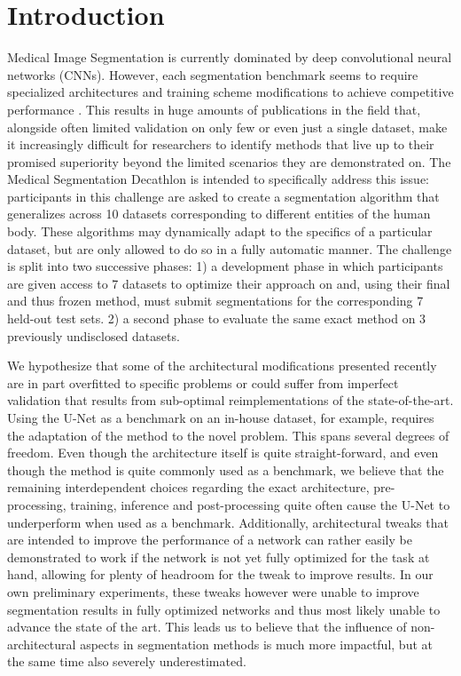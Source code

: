 \documentclass{templates/llncs}
\begin{document}
\section{Introduction}
    Medical Image Segmentation is currently dominated by deep convolutional neural networks (CNNs). However, each segmentation benchmark seems to require specialized architectures and training scheme modifications to achieve competitive performance \cite{isensee2017brain,li2017h,roy2018concurrent,oktay2018attention,jegou2017one}. This results in huge amounts of publications in the field that, alongside often limited validation on only few or even just a single dataset, make it increasingly difficult for researchers to identify methods that live up to their promised superiority beyond the limited scenarios they are demonstrated on. The Medical Segmentation Decathlon is intended to specifically address this issue: participants in this challenge are asked to create a segmentation algorithm that generalizes across 10 datasets corresponding to different entities of the human body. These algorithms may dynamically adapt to the specifics of a particular dataset, but are only allowed to do so in a fully automatic manner. The challenge is split into two successive phases: 1) a development phase in which participants are given access to 7 datasets to optimize their approach on and, using their final and thus frozen method, must submit segmentations for the corresponding 7 held-out test sets. 2) a second phase to evaluate the same exact method on 3 previously undisclosed datasets.
    
    We hypothesize that some of the architectural modifications presented recently are in part overfitted to specific problems or could suffer from imperfect validation that results from sub-optimal reimplementations of the state-of-the-art. Using the U-Net as a benchmark on an in-house dataset, for example, requires the adaptation of the method to the novel problem. This spans several degrees of freedom. Even though the architecture itself is quite straight-forward, and even though the method is quite commonly used as a benchmark, we believe that the remaining interdependent choices regarding the exact architecture, pre-processing, training, inference and post-processing quite often cause the U-Net to underperform when used as a benchmark. Additionally, architectural tweaks that are intended to improve the performance of a network can rather easily be demonstrated to work if the network is not yet fully optimized for the task at hand, allowing for plenty of headroom for the tweak to improve results. In our own preliminary experiments, these tweaks however were unable to improve segmentation results in fully optimized networks and thus most likely unable to advance the state of the art. This leads us to believe that the influence of non-architectural aspects in segmentation methods is much more impactful, but at the same time also severely underestimated. 
    
\end{document}
